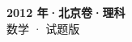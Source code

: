\documentclass[zihao=-4, a4paper]{ctexart}
\begin{document}
\begin{center}
  {\Large\bfseries 2012 年·北京卷·理科}\\[4pt]
  {\large 数学 · 试题版}
\end{center}
\medskip
{}

\end{document}
